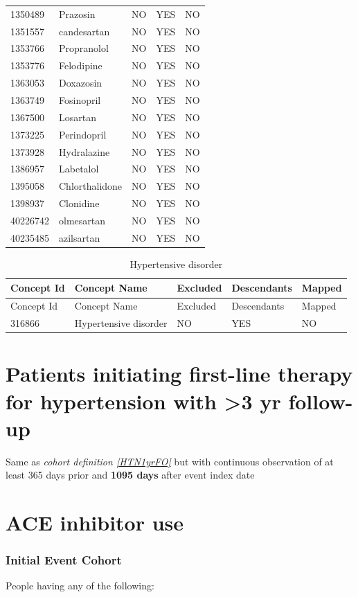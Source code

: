 \documentclass[11pt]{book}
\theoremstyle{definition}
\theoremstyle{definition}
\theoremstyle{definition}
\theoremstyle{remark}
\begin{document}
\begin{longtable}[]{@{}lllll@{}}
1350489 & Prazosin & NO & YES & NO\tabularnewline
1351557 & candesartan & NO & YES & NO\tabularnewline
1353766 & Propranolol & NO & YES & NO\tabularnewline
1353776 & Felodipine & NO & YES & NO\tabularnewline
1363053 & Doxazosin & NO & YES & NO\tabularnewline
1363749 & Fosinopril & NO & YES & NO\tabularnewline
1367500 & Losartan & NO & YES & NO\tabularnewline
1373225 & Perindopril & NO & YES & NO\tabularnewline
1373928 & Hydralazine & NO & YES & NO\tabularnewline
1386957 & Labetalol & NO & YES & NO\tabularnewline
1395058 & Chlorthalidone & NO & YES & NO\tabularnewline
1398937 & Clonidine & NO & YES & NO\tabularnewline
40226742 & olmesartan & NO & YES & NO\tabularnewline
40235485 & azilsartan & NO & YES & NO\tabularnewline
\bottomrule
\end{longtable}

\begin{longtable}[]{@{}lllll@{}}
\caption{\label{tab:HTN1yrFOHypertensiveDisorder} Hypertensive disorder}\tabularnewline
\toprule
Concept Id & Concept Name & Excluded & Descendants & Mapped\tabularnewline
\midrule
\endfirsthead
\toprule
Concept Id & Concept Name & Excluded & Descendants & Mapped\tabularnewline
\midrule
\endhead
316866 & Hypertensive disorder & NO & YES & NO\tabularnewline
\bottomrule
\end{longtable}

\hypertarget{HTN3yrFO}{%
\section{Patients initiating first-line therapy for hypertension with \textgreater3 yr follow-up}\label{HTN3yrFO}}

Same as \emph{cohort definition \ref{HTN1yrFO}} but with continuous observation of at least 365 days prior and \textbf{1095 days} after event index date

\hypertarget{ACEiUse}{%
\section{ACE inhibitor use}\label{ACEiUse}}

\hypertarget{initial-event-cohort-6}{%
\subsubsection*{Initial Event Cohort}\label{initial-event-cohort-6}}

People having any of the following:
\end{document}
